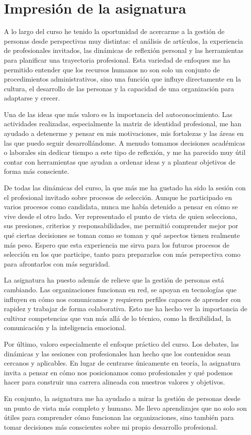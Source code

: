 \chapter{Impresión de la asignatura}

A lo largo del curso he tenido la oportunidad de acercarme a la gestión de personas desde perspectivas muy distintas: el análisis de artículos, la experiencia de profesionales invitados, las dinámicas de reflexión personal y las herramientas para planificar una trayectoria profesional. Esta variedad de enfoques me ha permitido entender que los recursos humanos no son solo un conjunto de procedimientos administrativos, sino una función que influye directamente en la cultura, el desarrollo de las personas y la capacidad de una organización para adaptarse y crecer.

Una de las ideas que más valoro es la importancia del autoconocimiento. Las actividades realizadas, especialmente la matriz de identidad profesional, me han ayudado a detenerme y pensar en mis motivaciones, mis fortalezas y las áreas en las que puedo seguir desarrollándome. A menudo tomamos decisiones académicas o laborales sin dedicar tiempo a este tipo de reflexión, y me ha parecido muy útil contar con herramientas que ayudan a ordenar ideas y a plantear objetivos de forma más consciente.

De todas las dinámicas del curso, la que más me ha gustado ha sido la sesión con el profesional invitado sobre procesos de selección. Aunque he participado en varios procesos como candidata, nunca me había detenido a pensar en cómo se vive desde el otro lado. Ver representado el punto de vista de quien selecciona, sus presiones, criterios y responsabilidades, me permitió comprender mejor por qué ciertas decisiones se toman como se toman y qué aspectos tienen realmente más peso. Espero que esta experiencia me sirva para los futuros procesos de selección en los que participe, tanto para prepararlos con más perspectiva como para afrontarlos con más seguridad.

La asignatura ha puesto además de relieve que la gestión de personas está cambiando. Las organizaciones funcionan en red, se apoyan en tecnologías que influyen en cómo nos comunicamos y requieren perfiles capaces de aprender con rapidez y trabajar de forma colaborativa. Esto me ha hecho ver la importancia de cultivar competencias que van más allá de lo técnico, como la flexibilidad, la comunicación y la inteligencia emocional.

Por último, valoro especialmente el enfoque práctico del curso. Los debates, las dinámicas y las sesiones con profesionales han hecho que los contenidos sean cercanos y aplicables. En lugar de centrarse únicamente en teoría, la asignatura invita a pensar en cómo nos posicionamos como profesionales y qué podemos hacer para construir una carrera alineada con nuestros valores y objetivos.

En conjunto, la asignatura me ha ayudado a mirar la gestión de personas desde un punto de vista más completo y humano. Me llevo aprendizajes que no solo son útiles para comprender cómo funcionan las organizaciones, sino también para tomar decisiones más conscientes sobre mi propio desarrollo profesional.
